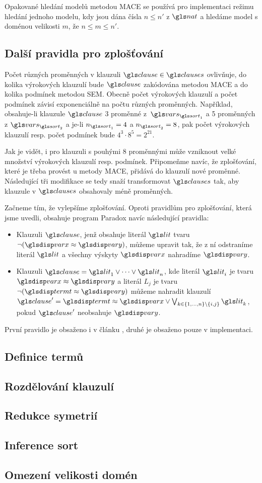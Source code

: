 Opakované hledání modelů metodou MACE se používá pro implementaci
režimu hledání jednoho modelu,
kdy jsou dána čísla $n \leq n'$ z $\nat$ a hledáme
model s doménou velikosti $m$, že $n \leq m \leq n'$.

\subsection{Další pravidla pro zplošťování}

Počet různých proměnných v klauzuli $\clause \in \clauses$
ovlivňuje, do kolika výrokových klauzulí bude $\clause$
zakódována metodou MACE a do kolika podmínek metodou SEM.
Obecně počet výrokových klauzulí a počet podmínek
závisí exponenciálně na počtu různých proměnných.
Například, obsahuje-li klauzule $\clause$ 3 proměnné z~$\vars_{\sort_1}$
a 5 proměnných z $\vars_{\sort_2}$ a je-li $n_{\sort_1} = 4$
a $n_{\sort_2} = 8$, pak počet výrokových klauzulí resp. počet podmínek
bude $4^3 \cdot 8^5 = 2^{21}$.

Jak je vidět, i pro klauzuli s pouhými 8 proměnnými může vzniknout
velké množství výrokových klauzulí resp. podmínek.
Připomeňme navíc, že zplošťování, které je třeba
provést u metody MACE, přidává do klauzulí nové proměnné.
Následující tři modifikace se tedy snaží transformovat
$\clauses$ tak, aby klauzule v $\clauses$ obsahovaly méně proměnných.

Začneme tím, že vylepšíme zplošťování. Oproti pravidlům
pro zplošťování, která jsme uvedli, obsahuje program Paradox \cite{paradox}
navíc následující pravidla:
\begin{itemize}
\item Klauzuli $\clause$, jenž obsahuje literál $\lit$ tvaru
  $\neg (\var \approx \varY)$, můžeme upravit tak,
  že z ní odstraníme literál $\lit$ a všechny výskyty
  $\var$ nahradíme $\varY$.
\item Klauzuli $\clause = \lit_1 \vee \cdots \vee \lit_n$, kde literál
  $\lit_i$ je tvaru $\var \approx \varY$ a literál $L_j$ je tvaru
  $\neg (\term \approx \varY)$ můžeme nahradit klauzulí
  $\clause' = \term \approx \var \vee
  \bigvee_{k \in \{ 1 \comdots n \} \setminus \{ i, j \}} \lit_k$, pokud $\clause'$
  neobsahuje $\varY$.
\end{itemize}
První pravidlo je obsaženo i v článku \cite{claessen03paradox},
druhé je obsaženo pouze v implementaci.

\subsection{Definice termů}

\subsection{Rozdělování klauzulí}

\subsection{Redukce symetrií}

\subsection{Inference sort}

\subsection{Omezení velikosti domén}
